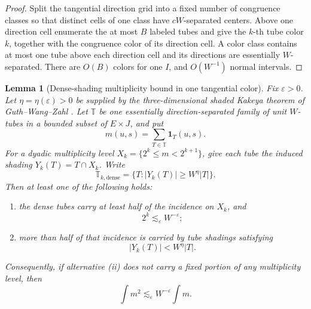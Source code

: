 \documentclass[10pt]{article}
\newtheorem{lemma}[theorem]{Lemma}
\begin{document}
\begin{proof}
Split the tangential direction grid into a fixed number of congruence classes so that distinct
cells of one class have \(cW\)-separated centers.  Above one direction cell enumerate the at most
\(B\) labeled tubes and give the \(k\)-th tube color \(k\), together with the congruence color of
its direction cell.  A color class contains at most one tube above each direction cell and its
directions are essentially \(W\)-separated.  There are \(O(B)\) colors for one \(I\), and
\(O(W^{-1})\) normal intervals.
\end{proof}

\begin{lemma}[Dense-shading multiplicity bound in one tangential color]
\label{lem:v058-dense-shading-multiplicity}
Fix \(\varepsilon>0\).  Let \(\eta=\eta(\varepsilon)>0\) be supplied by the
three-dimensional shaded Kakeya theorem of Guth--Wang--Zahl
\cite{GuthWangZahl2026}.  Let \(\mathbb T\) be one essentially direction-separated family of
unit \(W\)-tubes in a bounded subset of \(E\times J\), and put
\[
m(u,s)=\sum_{T\in\mathbb T}\mathbf 1_T(u,s).
\]
For a dyadic multiplicity level
\(X_k=\{2^k\le m<2^{k+1}\}\), give each tube the induced shading
\(Y_k(T)=T\cap X_k\).  Write
\[
\mathbb T_{k,\mathrm{dense}}
=
\{T:|Y_k(T)|\ge W^\eta|T|\}.
\]
Then at least one of the following holds:
\begin{enumerate}[label=\textnormal{(\roman*)}]
\item the dense tubes carry at least half of the incidence on \(X_k\), and
\begin{equation}
\label{eq:v058-dense-level-multiplicity}
\boxed{2^k\lesssim_\varepsilon W^{-\varepsilon};}
\end{equation}
\item more than half of that incidence is carried by tube shadings satisfying
\begin{equation}
\label{eq:v058-sparse-tube-shading}
\boxed{|Y_k(T)|<W^\eta|T|.}
\end{equation}
\end{enumerate}
Consequently, if alternative \textnormal{(ii)} does not carry a fixed portion of any multiplicity
level, then
\begin{equation}
\label{eq:v058-one-color-L2}
\boxed{
\int m^2
\lesssim_\varepsilon
W^{-\varepsilon}\int m.
}
\end{equation}
\end{lemma}
\end{document}
